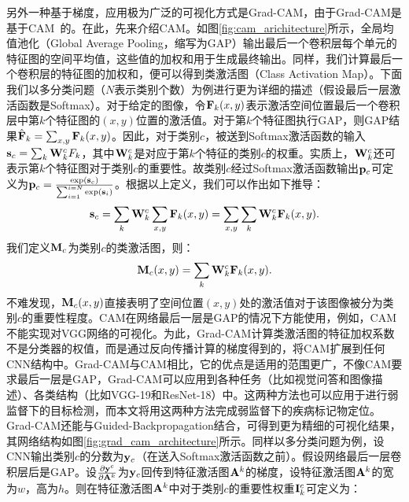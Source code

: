 另外一种基于梯度，应用极为广泛的可视化方式是Grad-CAM，由于Grad-CAM是基于CAM~\cite{zhou2016learning}的。在此，先来介绍CAM。如图\ref{fig:cam_arichitecture}所示，全局均值池化（Global Average Pooling，缩写为GAP）输出最后一个卷积层每个单元的特征图的空间平均值，这些值的加权和用于生成最终输出。同样，我们计算最后一个卷积层的特征图的加权和，便可以得到类激活图（Class Activation Map）。下面我们以多分类问题（$N$表示类别个数）为例进行更为详细的描述（假设最后一层激活函数是Softmax）。对于给定的图像，令$\mathbf{F}_k(x, y)$表示激活空间位置最后一个卷积层中第$k$个特征图的$(x,y)$位置的激活值。对于第$k$个特征图执行GAP，则GAP结果$\hat{\mathbf{F}}_k=\sum_{x, y} \mathbf{F}_{k}(x,y)$。因此，对于类别$c$，被送到Softmax激活函数的输入$\mathbf{s}_c=\sum_{k} \mathbf{W}_{k}^{c} F_{k}$，其中$\mathbf{W}_k^c$是对应于第$k$个特征的类别$c$的权重。实质上，$\mathbf{W}_{k}^{c}$还可表示第$k$个特征图对于类别$c$的重要性。故类别$c$经过Softmax激活函数输出${\mathbf{p}}_c$可定义为$\mathbf{p}_c=\frac{\exp \left(\mathbf{s}_{c}\right)}{\sum_{i=1}^{i=N} \exp \left(\mathbf{s}_{i}\right)}$。根据以上定义，我们可以作出如下推导：
\begin{equation}
\mathbf{s}_{c}=\sum_{k} \mathbf{W}_{k}^{c} \sum_{x, y} \mathbf{F}_{k}(x, y)=\sum_{x, y} \sum_{k} \mathbf{W}_{k}^{c} \mathbf{F}_{k}(x, y).
\end{equation}
我们定义$\mathbf{M}_c$为类别$c$的类激活图，则：
\begin{equation}\label{equ:cam_heatmap_compute}
\mathbf{M}_{c}(x, y)=\sum_{k} \mathbf{W}_{k}^{c} \mathbf{F}_{k}(x, y).
\end{equation}
不难发现，$\mathbf{M}_{c}(x, y)$直接表明了空间位置$(x,y)$处的激活值对于该图像被分为类别$c$的重要性程度。CAM在网络最后一层是GAP的情况下方能使用，例如，CAM不能实现对VGG网络的可视化。为此，Grad-CAM计算类激活图的特征加权系数不是分类器的权值，而是通过反向传播计算的梯度得到的，将CAM扩展到任何CNN结构中。Grad-CAM与CAM相比，它的优点是适用的范围更广，不像CAM要求最后一层是GAP，Grad-CAM可以应用到各种任务（比如视觉问答和图像描述）、各类结构（比如VGG-19和ResNet-18）中。这两种方法也可以应用于进行弱监督下的目标检测，而本文将用这两种方法完成弱监督下的疾病标记物定位。Grad-CAM还能与Guided-Backpropagation结合，可得到更为精细的可视化结果，其网络结构如图\ref{fig:grad_cam_architecture}所示。同样以多分类问题为例，设CNN输出类别$c$的分数为$\mathbf{y}_c$（在送入Softmax激活函数之前）。假设网络最后一层卷积层后是GAP。设$\frac{\partial \mathbf{y}^{c}}{\partial \mathbf{A}^{k}}$为$\mathbf{y}_c$回传到特征激活图$\mathbf{A}^{k}$的梯度，设特征激活图$\mathbf{A}^{k}$的宽为$w$，高为$h$。则在特征激活图$\mathbf{A}^{k}$中对于类别$c$的重要性权重$\mathbf{I}_{k}^{c}$可定义为：

